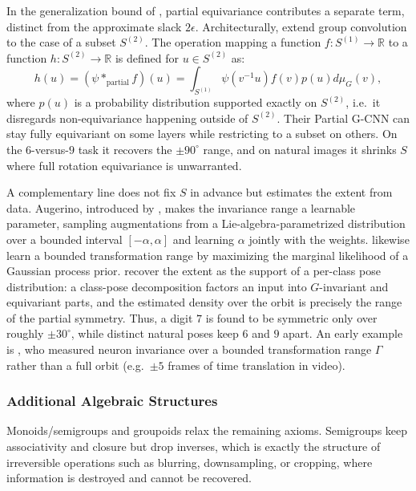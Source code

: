 \documentclass[mathematics,review,submit,moreauthors]{Definitions/mdpi}
\begin{document}
In the generalization bound of \citet{petrache2023}, partial equivariance contributes a separate term, distinct from the approximate slack $2\epsilon$.
Architecturally, \citet{romero2023} extend group convolution to the case of a subset $S^{(2)}$.
The operation mapping a function $f:S^{(1)}\to\mathbb{R}$ to a function $h:S^{(2)}\to\mathbb{R}$ is defined for $u\in S^{(2)}$ as:$$h(u) = (\psi *_{\mathrm{partial}} f)(u) = \int_{S^{(1)}} \psi(v^{-1}u)f(v) p(u) d\mu_{G}(v),$$ where $p(u)$ is a probability distribution supported exactly on $S^{(2)}$, i.e.\ it disregards non-equivariance happening outside of $S^{(2)}$.
Their Partial G-CNN can stay fully equivariant on some layers while restricting to a subset on others.
On the $6$-versus-$9$ task it recovers the $\pm 90^\circ$ range, and on natural images it shrinks $S$ where full rotation equivariance is unwarranted.

A complementary line does not fix $S$ in advance but estimates the extent from data.
Augerino, introduced by \citet{benton2020anips}, makes the invariance range a learnable parameter, sampling augmentations from a Lie-algebra-parametrized distribution over a bounded interval $[-\alpha,\alpha]$ and learning $\alpha$ jointly with the weights.
\citet{vanderwilk2018anips} likewise learn a bounded transformation range by maximizing the marginal likelihood of a Gaussian process prior.
\citet{urbano2026} recover the extent as the support of a per-class pose distribution: a class-pose decomposition factors an input into $G$-invariant and equivariant parts, and the estimated density over the orbit is precisely the range of the partial symmetry.
Thus, a digit $7$ is found to be symmetric only over roughly $\pm 30^\circ$, while distinct natural poses keep $6$ and $9$ apart.
An early example is \citet{goodfellow2009anips}, who measured neuron invariance over a bounded transformation range $\Gamma$ rather than a full orbit (e.g.\ $\pm 5$ frames of time translation in video).

\subsubsection{Additional Algebraic Structures}
Monoids/semigroups and groupoids relax the remaining axioms.
Semigroups keep associativity and closure but drop inverses, which is exactly the structure of irreversible operations such as blurring, downsampling, or cropping, where information is destroyed and cannot be recovered.
\end{document}

